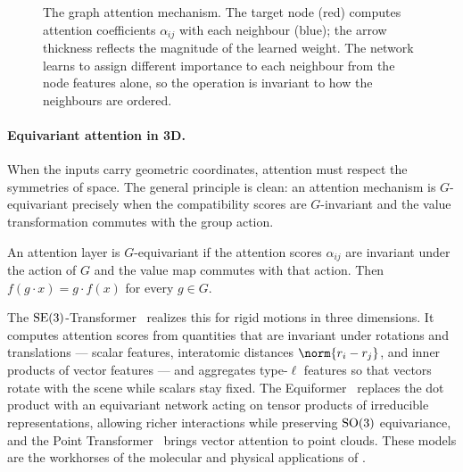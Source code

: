 \begin{figure}[h]
\caption[Graph attention mechanism]{The graph attention mechanism. The target
node (red) computes attention coefficients $\alpha_{ij}$ with each neighbour
(blue); the arrow thickness reflects the magnitude of the learned weight. The
network learns to assign different importance to each neighbour from the node
features alone, so the operation is invariant to how the neighbours are
ordered.}
\label{fig:apps:gat}
\end{figure}

\paragraph{Equivariant attention in 3D.}
When the inputs carry geometric coordinates, attention must respect the
symmetries of space. The general principle is clean: an attention mechanism is
$G$-equivariant precisely when the compatibility scores are $G$-invariant and
the value transformation commutes with the group action.

\begin{proposition}
\label{prop:apps:equiv-attn}
An attention layer is $G$-equivariant if the attention scores $\alpha_{ij}$ are
invariant under the action of $G$ and the value map commutes with that action.
Then $f(g\cdot x) = g\cdot f(x)$ for every $g\in G$.
\end{proposition}

The $\mathrm{SE}(3)$-Transformer~\citep{fuchs2020se3transformers} realizes this for
rigid motions in three dimensions. It computes attention scores from quantities
that are invariant under rotations and translations --- scalar features,
interatomic distances $\norm{r_i - r_j}$, and inner products of vector features
--- and aggregates type-$\ell$ features so that vectors rotate with the scene
while scalars stay fixed. The Equiformer~\citep{liao2022equiformer} replaces the
dot product with an equivariant network acting on tensor products of irreducible
representations, allowing richer interactions while preserving $\mathrm{SO}(3)$
equivariance, and the Point Transformer~\citep{zhao2021point} brings vector
attention to point clouds. These models are the workhorses of the molecular and
physical applications of .

